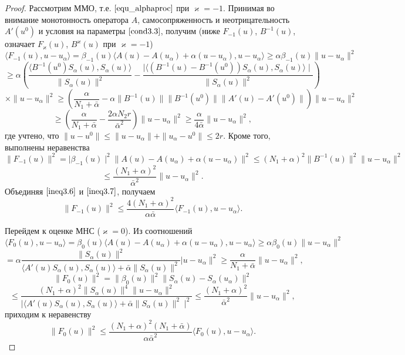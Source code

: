 \begin{proof} Рассмотрим  ММО, т.е. $\eqref{equ_alphaproc}$ при $\varkappa=-1$. Принимая во внимание монотонность оператора $A$, самосопряженность и неотрицательность $A'(u^0)$ и условия на параметры $\eqref{cond3.3}$, получим (ниже $F_{-1}(u)$, $B^{-1}(u)$, означает $F_\varkappa(u)$, $B^\varkappa(u)$ при $\varkappa=-1$)
$$ \langle F_{-1}(u), u-u_\alpha\rangle=\beta_{-1}(u)\langle A(u)-A(u_\alpha)+ \alpha(u-u_\alpha),u-u_\alpha\rangle\ge\alpha\beta_{-1}(u)\|u-u_\alpha\|^2
$$ $$\ge\alpha\left(\frac{\langle B^{-1}(u^0)S_\alpha(u), S_\alpha(u)\rangle}{\|S_\alpha (u)\|^2}-\frac{\mid\langle (B^{-1}(u)-B^{-1}(u^0))S_\alpha(u), S_\alpha (u)\rangle \mid}{\|S_\alpha (u)\|^2}\right)$$
$$\times \|u-u_\alpha\|^2 \ge\left(\frac{\alpha}{N_1+\bar\alpha}-\alpha\|B^{-1}(u)\|\|B^{-1}(u^0)\|\|A'(u)-A'(u^0)\|\right)\|u-u_\alpha\|^2$$ 
\begin{equation}\label{ineq3.6}
\ge\left(\frac{\alpha}{N_1+\bar\alpha}-\frac{2\alpha N_2r}{\bar\alpha ^2}\right)\|u-u_\alpha\|^2\ge\frac{\alpha}{4\bar\alpha}\|u-u_\alpha\|^2,\end{equation}
где учтено, что $\|u-u^0\|\le\|u-u_\alpha\|+\|u_\alpha-u^0\|\le 2r.$ Кроме того, выполнены неравенства $$\|F_{-1}(u)\|^2=\mid\beta_{-1}(u)\mid^2\|A(u)-A(u_\alpha)+\alpha(u-u_\alpha)\|^2\le(N_1+\alpha)^2\|B^{-1}(u)\|^2\|u-u_\alpha\|^2 $$
\begin{equation}\label{ineq3.7}
\le\frac{(N_1+\alpha)^2}{\bar\alpha^2}\|u-u_\alpha\|^2 .
\end{equation}
Объединяя $\eqref{ineq3.6}$ и $\eqref{ineq3.7}$, получаем
\begin{equation}\label{ineq3.8}
\|F_{-1}(u)\|^2\le\frac{4(N_1+\alpha)^2}{\alpha\bar\alpha}\langle F_{-1}(u), u-u_\alpha\rangle.
\end{equation}

Перейдем к оценке МНС ($\varkappa=0$). Из соотношений
$$\langle F_0(u), u-u_\alpha\rangle=\beta_0(u)\langle A(u)-A(u_\alpha)+\alpha(u-u_\alpha), u-u_\alpha\rangle\ge\alpha\beta_0(u)\|u-u_\alpha\|^2$$ 
\begin{equation}\label{ineq3.9}
=\alpha\frac{\|S_\alpha (u)\|^2}{\langle A'(u)S_\alpha (u),S_\alpha (u)\rangle +\bar\alpha\|S_\alpha (u)\|^2}|u-u_\alpha\|^2\ge \frac{\alpha}{N_1+\bar\alpha}\|u-u_\alpha\|^2,\end{equation}
$$
\|F_0(u)\|^2=\|\beta_0(u)\|^2\|S_\alpha(u)-S_\alpha(u_\alpha)\|^2 $$
\begin{equation}\label{ineq3.10}\le\frac{(N_1+\alpha)^2\|S_\alpha (u)\|^4\|u-u_\alpha\|^2}{\mid\langle A'(u)S_\alpha (u),S_\alpha (u)\rangle +\bar\alpha\|S_\alpha (u)\|^2\mid ^2}\le\frac{(N_1+\alpha)^2}{\bar\alpha^2}\|u-u_\alpha\|^2,
\end{equation}
приходим к неравенству
$$\|F_0(u)\|^2\le\frac{(N_1+\alpha)^2(N_1+\bar\alpha)}{\alpha\bar\alpha^2}\langle F_0(u), u-u_\alpha\rangle.$$


\end{proof}
